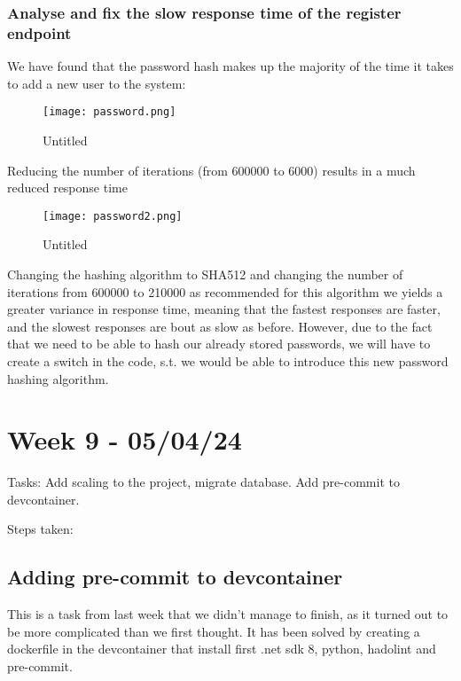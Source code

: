 \subsubsection{Analyse and fix the slow response time of the register endpoint}
\label{log:analyse-and-fix-the-slow-response-time-of-the-register-endpoint}

We have found that the password hash makes up the majority of the time it takes to add a new user to the system:

\begin{figure}
\centering
\texttt{[image: password.png]}
\caption{Untitled}
\end{figure}

Reducing the number of iterations (from 600000 to 6000) results in a much reduced response time

\begin{figure}
\centering
\texttt{[image: password2.png]}
\caption{Untitled}
\end{figure}

Changing the hashing algorithm to SHA512 and changing the number of iterations from 600000 to 210000 as recommended for this algorithm we yields a greater variance in response time, meaning that the fastest responses are faster, and the slowest responses are bout as slow as before. However, due to the fact that we need to be able to hash our already stored passwords, we will have to create a switch in the code, s.t. we would be able to introduce this new password hashing algorithm.

\section{Week 9 - 05/04/24}
\label{log:week9}

Tasks: Add scaling to the project, migrate database. Add pre-commit to
devcontainer.

Steps taken:

\subsection{Adding pre-commit to devcontainer}
\label{log:adding-pre-commit-to-devcontainer}

This is a task from last week that we didn't manage to finish, as it turned out to be more complicated than we first thought. It has been solved by creating a dockerfile in the devcontainer that install first .net sdk 8, python, hadolint and pre-commit.

